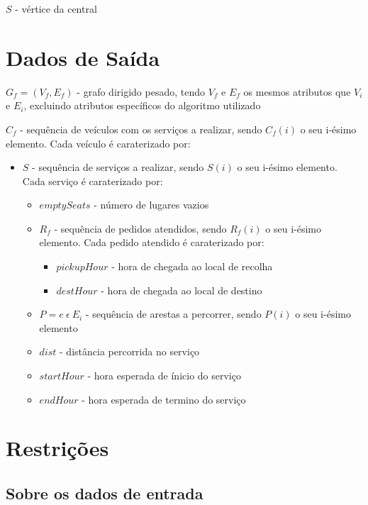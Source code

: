 \documentclass[article, a4paper, 12pt, oneside]{memoir}
\begin{document}
$S$ - vértice da central

\section{Dados de Saída}

$G_f = (V_f, E_f)$ - grafo dirigido pesado, tendo $V_f$ e $E_f$ os mesmos atributos que $V_i$ e $E_i$, excluindo atributos específicos do algoritmo utilizado

$C_f$ - sequência de veículos com os serviços a realizar, sendo $C_f(i)$ o seu i-ésimo elemento. Cada veículo é caraterizado por:
\begin{itemize}
	\item $S$ - sequência de serviços a realizar, sendo $S(i)$ o seu i-ésimo elemento. Cada serviço é caraterizado por:
	\begin{itemize}
		\item $emptySeats$ - número de lugares vazios
		\item $R_f$ - sequência de pedidos atendidos, sendo $R_f(i)$ o seu i-ésimo elemento. Cada pedido atendido é caraterizado por:
		\begin{itemize}
			\item $pickupHour$ - hora de chegada ao local de recolha
			\item $destHour$ - hora de chegada ao local de destino
		\end{itemize}
		\item $P = { e ~ \epsilon ~ E_i }$ - sequência de arestas a percorrer, sendo $P(i)$ o seu i-ésimo elemento
		\item $dist$ - distância percorrida no serviço
		\item $startHour$ - hora esperada de ínicio do serviço
		\item $endHour$ - hora esperada de termino do serviço
	\end{itemize}
\end{itemize}

\section{Restrições}

\subsection{Sobre os dados de entrada}
\end{document}
